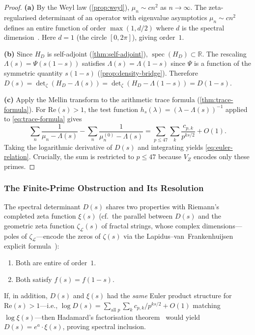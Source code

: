 \documentclass[11pt,a4paper]{article}
\theoremstyle{plain}
\theoremstyle{remark}
\newcommand{\R}{\mathbb{R}}
\newcommand{\spec}{\operatorname{spec}}
\begin{document}
\begin{proof}
\textbf{(a)}\enspace
By the Weyl law (\cref{prop:weyl}), $\mu_n\sim cn^2$ as $n\to\infty$.
The zeta-regularised determinant of an operator with eigenvalue
asymptotics $\mu_n\sim cn^2$ defines an entire function of order
$\max(1,d/2)$ where $d$ is the spectral dimension~\cite{reed-simon1978}.
Here $d=1$ (the circle $[0,2\pi]$), giving order~$1$.

\textbf{(b)}\enspace
Since $H_D$ is self-adjoint (\cref{thm:self-adjoint}),
$\spec(H_D)\subset\R$.  The rescaling $\Lambda(s)=\Psi(s(1{-}s))$
satisfies $\Lambda(s)=\Lambda(1-s)$ since $\Psi$ is a function of
the symmetric quantity $s(1{-}s)$ (\cref{prop:density-bridge}).  Therefore
$D(s) = \det_\zeta(H_D-\Lambda(s)) = \det_\zeta(H_D-\Lambda(1-s)) = D(1-s)$.

\textbf{(c)}\enspace
Apply the Mellin transform to the arithmetic trace formula
(\cref{thm:trace-formula}).  For $\mathrm{Re}(s)>1$, the test function
$h_s(\lambda) = (\lambda-\Lambda(s))^{-1}$ applied to
\cref{eq:trace-formula} gives
\[
  \sum_n \frac{1}{\mu_n-\Lambda(s)} - \sum_n \frac{1}{\mu_n^{(0)}-\Lambda(s)}
  = \sum_{p\leq 47}\sum_k \frac{c_{p,k}}{p^{ks/2}} + O(1).
\]
Taking the logarithmic derivative of $D(s)$ and integrating yields
\cref{eq:euler-relation}.  Crucially, the sum is restricted to
$p\leq 47$ because $V_Z$ encodes only these primes.
\end{proof}

\subsubsection{The Finite-Prime Obstruction and Its Resolution}
\label{sec:obstruction}

The spectral determinant $D(s)$ shares two properties with Riemann's
completed zeta function $\xi(s)$ (cf.\ the parallel between $D(s)$ and
the geometric zeta function $\zeta_{\mathcal{L}}(s)$ of fractal strings,
whose complex dimensions---poles of $\zeta_{\mathcal{L}}$---encode the
zeros of $\zeta(s)$ via the Lapidus--van~Frankenhuijsen explicit
formula~\cite{lapidus-vf2013}):
\begin{enumerate}[nosep,label=(\roman*)]
  \item Both are entire of order~$1$.
  \item Both satisfy $f(s)=f(1-s)$.
\end{enumerate}
If, in addition, $D(s)$ and $\xi(s)$ had the \emph{same} Euler product
structure for $\mathrm{Re}(s)>1$---i.e.,
$\log D(s) = \sum_{\text{all }p}\sum_k c_{p,k}/p^{ks/2} + O(1)$
matching $\log\xi(s)$---then Hadamard's factorisation
theorem~\cite{hadamard1893} would yield $D(s) = e^a\cdot\xi(s)$,
proving spectral inclusion.
\end{document}
